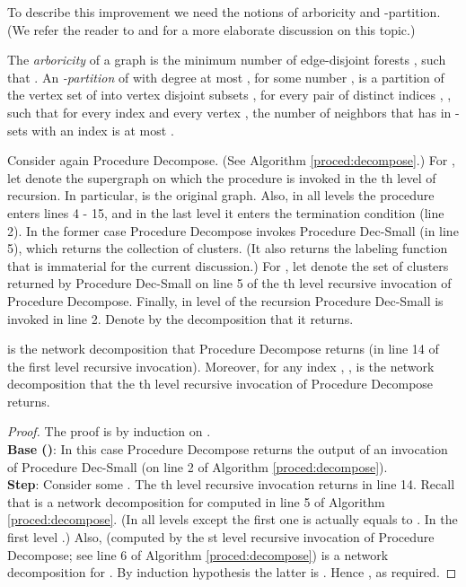 \documentclass[11pt]{article}
\begin{document}
To describe this improvement we need the notions of arboricity and -partition. (We refer the reader to \cite{BE08} and \cite{BE13} for a more elaborate discussion on this topic.)

The {\em arboricity}  of a graph  is the minimum number  of edge-disjoint forests , such that . An {\em -partition}  of  with degree at most , for some number , is a partition of the vertex set  of  into vertex disjoint subsets ,  for every pair of distinct indices , , such that for every index  and every vertex , the number of neighbors  that  has in -sets  with an index  is at most .

Consider again Procedure Decompose. (See Algorithm \ref{proced:decompose}.) For , let  denote the supergraph on which the procedure is invoked in the th level of recursion. In particular,  is the original graph. Also, in all levels  the procedure enters lines 4 - 15, and in the last level  it enters the termination condition (line 2). In the former case Procedure Decompose invokes Procedure Dec-Small (in line 5), which returns the collection  of clusters. (It also returns the labeling function that is immaterial for the current discussion.) For , let  denote the set of clusters returned by Procedure Dec-Small on line 5 of the th level recursive invocation of Procedure Decompose. Finally, in level  of the recursion Procedure Dec-Small is invoked in line 2. Denote by  the decomposition that it returns.
\begin{lem} \label{sets}
 is the network decomposition that Procedure Decompose returns (in line 14 of the first level recursive invocation). Moreover, for any index , ,  is the network decomposition that the th level recursive invocation of Procedure Decompose returns.
\end{lem}
\begin{proof}
The proof is by induction on . \\
{\bf Base ()}: In this case Procedure Decompose returns the output  of an invocation of Procedure Dec-Small (on line 2 of Algorithm \ref{proced:decompose}).\\
{\bf Step}: Consider some . The th level recursive invocation returns  in line 14. Recall that  is a network decomposition for  computed in line 5 of Algorithm \ref{proced:decompose}. (In all levels except the first one  is actually equals to . In the first level .)
Also,  (computed by the st level recursive invocation of Procedure Decompose; see line 6 of Algorithm \ref{proced:decompose}) is a network decomposition for . By induction hypothesis the latter is  . Hence , as required.
\end{proof}
\end{document}
